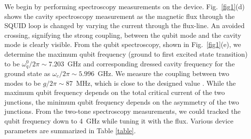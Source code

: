 \documentclass[a4paper, amsfonts, amssymb, amsmath, reprint,showkeys,nofootinbib,superscriptaddress]{revtex4-2}
\begin{document}
We begin by performing spectroscopy measurements on the device. Fig.~\ref{fig1}(d)
shows the cavity spectroscopy measurement as the magnetic flux through the SQUID loop is
changed by varying the current through the flux-line. An avoided crossing,
signifying the strong coupling, between the qubit mode and the cavity mode is 
clearly visible. 
%
From the qubit spectroscopy, shown in Fig.~\ref{fig1}(e), we determine the maximum qubit frequency
(ground to first excited state transition) to be $\omega_{q}^0/2\pi\sim7.203$~GHz
and corresponding dressed cavity frequency for the ground state as 
$\omega_{c}/2\pi\sim5.996$~GHz. We measure the coupling between two modes to be 
$g/2\pi\sim 87$~MHz, which is close to the designed value 
\cite{nigg_black-box_2012}.
%
While the maximum qubit frequency depends on the total critical current of the two
junctions, the minimum qubit frequency depends on the asymmetry of the two 
junctions.
From the two-tone spectroscopy measurements, we could tracked the qubit frequency
down to 4~GHz while tuning it with the flux.
Various device parameters are summarized in Table \ref{table}.
\end{document}
